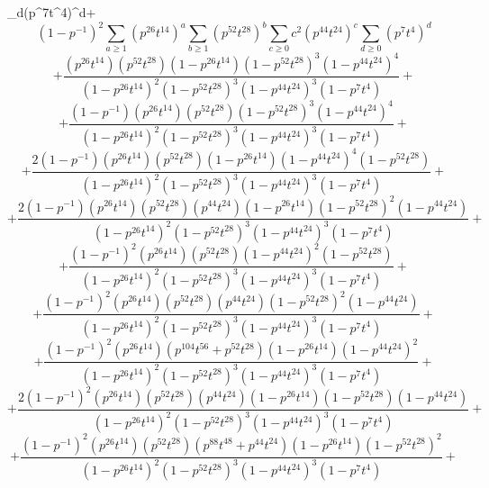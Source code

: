 \documentclass{article}
\begin{document}
\sum_{d}(p^{7}t^{4})^{d}\]+\[(1-p^{-1})^{2}\sum_{a\geq{1}}(p^{26}t^{14})^{a}\sum_{b\geq{1}}(p^{52}t^{28})^{b}\sum_{c\geq{0}}c^{2}(p^{44}t^{24})^{c}\sum_{d\geq{0}}(p^{7}t^{4})^{d}\]\[+\frac{(p^{26}t^{14})(p^{52}t^{28})(1-p^{26}t^{14})(1-p^{52}t^{28})^{3}(1-p^{44}t^{24})^{4}}{(1-p^{26}t^{14})^{2}(1-p^{52}t^{28})^{3}(1-p^{44}t^{24})^{3}(1-p^{7}t^{4})}+\]\[+\frac{(1-p^{-1})(p^{26}t^{14})(p^{52}t^{28})(1-p^{52}t^{28})^{3}(1-p^{44}t^{24})^{4}}{(1-p^{26}t^{14})^{2}(1-p^{52}t^{28})^{3}(1-p^{44}t^{24})^{3}(1-p^{7}t^{4})}+\]\[+\frac{2(1-p^{-1})(p^{26}t^{14})(p^{52}t^{28})(1-p^{26}t^{14})(1-p^{44}t^{24})^{4}(1-p^{52}t^{28})}{(1-p^{26}t^{14})^{2}(1-p^{52}t^{28})^{3}(1-p^{44}t^{24})^{3}(1-p^{7}t^{4})}+\]\[+\frac{2(1-p^{-1})(p^{26}t^{14})(p^{52}t^{28})(p^{44}t^{24})(1-p^{26}t^{14})(1-p^{52}t^{28})^{2}(1-p^{44}t^{24})}{(1-p^{26}t^{14})^{2}(1-p^{52}t^{28})^{3}(1-p^{44}t^{24})^{3}(1-p^{7}t^{4})}+\]\[+\frac{(1-p^{-1})^{2}(p^{26}t^{14})(p^{52}t^{28})(1-p^{44}t^{24})^{2}(1-p^{52}t^{28})}{(1-p^{26}t^{14})^{2}(1-p^{52}t^{28})^{3}(1-p^{44}t^{24})^{3}(1-p^{7}t^{4})}+\]\[+\frac{(1-p^{-1})^{2}(p^{26}t^{14})(p^{52}t^{28})(p^{44}t^{24})(1-p^{52}t^{28})^{2}(1-p^{44}t^{24})}{(1-p^{26}t^{14})^{2}(1-p^{52}t^{28})^{3}(1-p^{44}t^{24})^{3}(1-p^{7}t^{4})}+\]\[+\frac{(1-p^{-1})^{2}(p^{26}t^{14})(p^{104}t^{56}+p^{52}t^{28})(1-p^{26}t^{14})(1-p^{44}t^{24})^{2}}{(1-p^{26}t^{14})^{2}(1-p^{52}t^{28})^{3}(1-p^{44}t^{24})^{3}(1-p^{7}t^{4})}+\]\[+\frac{2(1-p^{-1})^{2}(p^{26}t^{14})(p^{52}t^{28})(p^{44}t^{24})(1-p^{26}t^{14})(1-p^{52}t^{28})(1-p^{44}t^{24})}{(1-p^{26}t^{14})^{2}(1-p^{52}t^{28})^{3}(1-p^{44}t^{24})^{3}(1-p^{7}t^{4})}+\]\[+\frac{(1-p^{-1})^{2}(p^{26}t^{14})(p^{52}t^{28})(p^{88}t^{48}+p^{44}t^{24})(1-p^{26}t^{14})(1-p^{52}t^{28})^{2}}{(1-p^{26}t^{14})^{2}(1-p^{52}t^{28})^{3}(1-p^{44}t^{24})^{3}(1-p^{7}t^{4})}+\]
\end{document}
